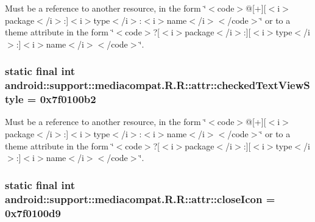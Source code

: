 Must be a reference to another resource, in the form \char`\"{}$<$code$>$@\mbox{[}+\mbox{]}\mbox{[}$<$i$>$package$<$/i$>$:\mbox{]}$<$i$>$type$<$/i$>$:$<$i$>$name$<$/i$>$$<$/code$>$\char`\"{} or to a theme attribute in the form \char`\"{}$<$code$>$?\mbox{[}$<$i$>$package$<$/i$>$:\mbox{]}\mbox{[}$<$i$>$type$<$/i$>$:\mbox{]}$<$i$>$name$<$/i$>$$<$/code$>$\char`\"{}. \hypertarget{classandroid_1_1support_1_1mediacompat_1_1_r_1_1attr_3b81b40abebac7cc8ff28828b9697952}{
\subsubsection[{checkedTextViewStyle}]{\setlength{\rightskip}{0pt plus 5cm}static final int android::support::mediacompat.R.R::attr::checkedTextViewStyle = 0x7f0100b2}}
\label{classandroid_1_1support_1_1mediacompat_1_1_r_1_1attr_3b81b40abebac7cc8ff28828b9697952}


Must be a reference to another resource, in the form \char`\"{}$<$code$>$@\mbox{[}+\mbox{]}\mbox{[}$<$i$>$package$<$/i$>$:\mbox{]}$<$i$>$type$<$/i$>$:$<$i$>$name$<$/i$>$$<$/code$>$\char`\"{} or to a theme attribute in the form \char`\"{}$<$code$>$?\mbox{[}$<$i$>$package$<$/i$>$:\mbox{]}\mbox{[}$<$i$>$type$<$/i$>$:\mbox{]}$<$i$>$name$<$/i$>$$<$/code$>$\char`\"{}. \hypertarget{classandroid_1_1support_1_1mediacompat_1_1_r_1_1attr_21972b2264579e655463cc4e496289e4}{
\subsubsection[{closeIcon}]{\setlength{\rightskip}{0pt plus 5cm}static final int android::support::mediacompat.R.R::attr::closeIcon = 0x7f0100d9}}
\label{classandroid_1_1support_1_1mediacompat_1_1_r_1_1attr_21972b2264579e655463cc4e496289e4}


